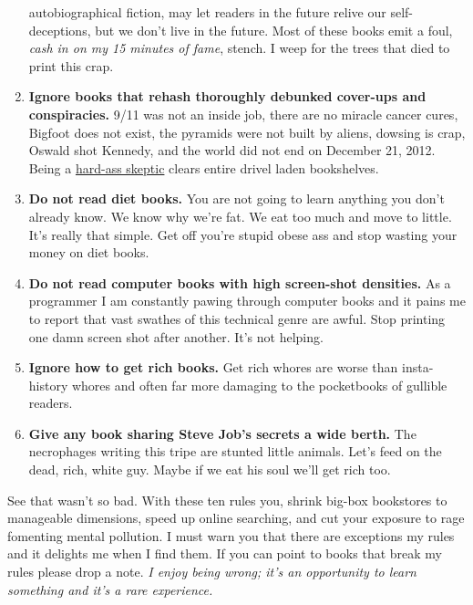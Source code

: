 \begin{enumerate}
  autobiographical fiction, may let readers in the future relive our
  self-deceptions, but we don't live in the future. Most of these books
  emit a foul, \emph{cash in on my 15 minutes of fame}, stench. I weep
  for the trees that died to print this crap.
\item
  \textbf{Ignore books that rehash thoroughly debunked cover-ups and
  conspiracies.} 9/11 was not an inside job, there are no miracle cancer
  cures, Bigfoot does not exist, the pyramids were not built by aliens,
  dowsing is crap, Oswald shot Kennedy, and the world did not end on
  December 21, 2012. Being a
  \href{http://bakerjd99.wordpress.com/2009/10/29/hard-ass-skeptic-rules/}{hard-ass
  skeptic} clears entire drivel laden bookshelves.
\item
  \textbf{Do not read diet books.} You are not going to learn anything
  you don't already know. We know why we're fat. We eat too much and
  move to little. It's really that simple. Get off you're stupid obese
  ass and stop wasting your money on diet books.
\item
  \textbf{Do not read computer books with high screen-shot densities.}
  As a programmer I am constantly pawing through computer books and it
  pains me to report that vast swathes of this technical genre are
  awful. Stop printing one damn screen shot after another. It's not
  helping.
\item
  \textbf{Ignore how to get rich books.} Get rich whores are worse than
  insta-history whores and often far more damaging to the pocketbooks of
  gullible readers.
\item
  \textbf{Give any book sharing Steve Job's secrets a wide berth.} The
  necrophages writing this tripe are stunted little animals. Let's feed
  on the dead, rich, white guy. Maybe if we eat his soul we'll get rich
  too.
\end{enumerate}

See that wasn't so bad. With these ten rules you, shrink big-box
bookstores to manageable dimensions, speed up online searching, and
cut your exposure to rage fomenting mental pollution. I must warn you
that there are exceptions my rules and it delights me when I find them.
If you can point to books that break my rules please drop a note.
\emph{I enjoy being wrong; it's an opportunity to learn something and
it's a rare experience.}



%
